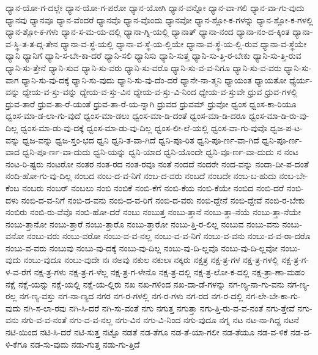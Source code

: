 {ಧ್ಯಾನ-ಯೋ-ಗ-ದಲ್ಲೇ
ಧ್ಯಾನ-ಯೋ-ಗ-ಪರೋ
ಧ್ಯಾನ-ಯೋಗಿ
ಧ್ಯಾನ-ವನ್ನೋ
ಧ್ಯಾನ-ವಾ-ಗಲಿ
ಧ್ಯಾನ-ವಾ-ಗು-ವುದು
ಧ್ಯಾನವು
ಧ್ಯಾನವೂ
ಧ್ಯಾನ-ವೆಂದರೆ
ಧ್ಯಾನವೊ
ಧ್ಯಾನ-ವೊಂದು
ಧ್ಯಾನವೋ
ಧ್ಯಾನ-ಶ್ಲೋ-ಕ-ಗಳನ್ನು
ಧ್ಯಾನ-ಶ್ಲೋ-ಕ-ಗಳಲ್ಲಿ
ಧ್ಯಾನ-ಶ್ಲೋ-ಕ-ಗಳು
ಧ್ಯಾನ-ಸ-ಮ-ಯ-ದಲ್ಲಿ
ಧ್ಯಾನಾ-ಗ್ನಿ-ಯಲ್ಲಿ
ಧ್ಯಾನಾತ್
ಧ್ಯಾನಾ-ನಂದ
ಧ್ಯಾನಾ-ನಂ-ದ-ಕ್ಕಿಂತ
ಧ್ಯಾನಾ-ವ-ಸ್ಥಿ-ತ-ತ-ದ್ಗ-ತೇನ
ಧ್ಯಾನಾ-ವ-ಸ್ಥೆ-ಯಲ್ಲಿ
ಧ್ಯಾನಾ-ವ-ಸ್ಥೆ-ಯ-ಲ್ಲಿಯೇ
ಧ್ಯಾನಾ-ವ-ಸ್ಥೆ-ಯ-ಲ್ಲಿ-ರುವ
ಧ್ಯಾನಾ-ವ-ಸ್ಥೆಯೇ
ಧ್ಯಾನಿ
ಧ್ಯಾನಿಗೆ
ಧ್ಯಾನಿ-ಸ-ಬೇ-ಕಾ-ದರೆ
ಧ್ಯಾನಿ-ಸಲಿ
ಧ್ಯಾನಿಸು
ಧ್ಯಾನಿ-ಸುತ್ತ
ಧ್ಯಾನಿ-ಸು-ತ್ತಿ-ರ-ಬೇಕು
ಧ್ಯಾನಿ-ಸು-ತ್ತಿ-ರುವ
ಧ್ಯಾನಿ-ಸು-ತ್ತೇನೆ
ಧ್ಯಾನಿ-ಸುವ
ಧ್ಯಾನಿ-ಸು-ವರು
ಧ್ಯಾನಿ-ಸು-ವರೊ
ಧ್ಯಾನಿ-ಸು-ವ-ವ-ನಿಗೂ
ಧ್ಯಾನಿ-ಸು-ವ-ವರು
ಧ್ಯಾನಿ-ಸು-ವಾಗ
ಧ್ಯಾನಿ-ಸು-ವು-ದಕ್ಕೆ
ಧ್ಯಾನಿ-ಸು-ವುದು
ಧ್ಯಾನಿ-ಸು-ವು-ದೆಂ-ದರೆ
ಧ್ಯಾನೇ-ನಾ-ತ್ಮನಿ
ಧ್ಯಾಯಂತ
ಧ್ಯಾಯತೋ
ಧ್ಯೆರ್ಯ-ವನ್ನು
ಧ್ಯೇಯ-ವ-ಸ್ತು-ವನ್ನು
ಧ್ಯೇಯ-ವ-ಸ್ತು-ವಿನ
ಧ್ಯೇಯ-ವ-ಸ್ತು-ವಿ-ನಿಂದ
ಧ್ಯೇಯ-ವ-ಸ್ತುವೇ
ಧ್ರುವ
ಧ್ರುವ-ಗಳಲ್ಲಿ
ಧ್ರುವ-ತಾರೆ
ಧ್ರುವ-ತಾ-ರೆ-ಯಂತೆ
ಧ್ರುವ-ತಾ-ರೆ-ಯ-ನ್ನಾಗಿ
ಧ್ರುವದ
ಧ್ರುವಮ್
ಧ್ರುವೋ
ಧ್ವಂಸ
ಧ್ವಂಸ-ಕಾ-ರಿಯೂ
ಧ್ವಂಸ-ಮಾ-ಡ-ಲಾ-ಗು-ವುದೆ
ಧ್ವಂಸ-ಮಾ-ಡಲು
ಧ್ವಂಸ-ಮಾ-ಡಿ-ದಂತೆ
ಧ್ವಂಸ-ಮಾ-ಡಿ-ದರೂ
ಧ್ವಂಸ-ಮಾ-ಡಿ-ರು-ವು-ದಿಲ್ಲ
ಧ್ವಂಸ-ಮಾ-ಡು-ವು-ದಕ್ಕೆ
ಧ್ವಂಸ-ಮಾ-ಡು-ವು-ದಿಲ್ಲ
ಧ್ವಂಸ-ಲೀ-ಲೆ-ಯಲ್ಲಿ
ಧ್ವಂಸ-ವಾ-ಗು-ವುವೊ
ಧ್ವಜ-ಪ-ಟ-ವನ್ನು
ಧ್ವಜ-ವನ್ನು
ಧ್ವಜ-ಸ್ತಂ-ಭದ
ಧ್ವನಿ
ಧ್ವನಿ-ತ-ವಾ-ಗಿದೆ
ಧ್ವನಿ-ಪೂ-ರಿತ
ಧ್ವನಿ-ಪೂ-ರ್ಣ-ವಾ-ಗಿದೆ
ಧ್ವನಿ-ಪೂ-ರ್ಣ-ವಾದ
ಧ್ವನಿ-ಪೂ-ರ್ಣ-ವಾ-ದುದು
ಧ್ವನಿ-ಯನ್ನು
ಧ್ವನಿ-ಯಾದ
ಧ್ವನಿ-ಯೊಂದೇ
ಧ್ವನಿ-ವೂ-ರ್ಣ-ವಾ-ದುದು
ನ
ನಂಟ
ನಂಟ-ರಿ-ಷ್ಟರು
ನಂಟರೋ
ನಂತರ
ನಂತ-ರದ
ನಂತ-ರವೂ
ನಂತೆ
ನಂದದೆ
ನಂದರೇ
ನಂದ-ವನ್ನು
ನಂದಾ-ದೀ-ಪ-ದಂತೆ
ನಂದಿ-ಹೋ-ಗು-ವು-ದಿಲ್ಲ
ನಂಬದ
ನಂಬ-ದ-ವ-ನಿಗೆ
ನಂಬ-ದ-ವರು
ನಂಬದೆ
ನಂಬದೇ
ನಂಬ-ಬ-ಹುದು
ನಂಬ-ಬೇ-ಕೆಂಬ
ನಂಬರು
ನಂಬರ್
ನಂಬಲು
ನಂಬಿ
ನಂಬಿಕೆ
ನಂಬಿ-ಕೆಗೆ
ನಂಬಿ-ಕೆಯ
ನಂಬಿ-ಕೆಯೇ
ನಂಬಿದ
ನಂಬಿ-ದರೆ
ನಂಬಿ-ದಳು
ನಂಬಿ-ದ-ವ-ನಿಗೆ
ನಂಬಿ-ದ-ವನು
ನಂಬಿ-ದ-ವ-ರಿಗೆ
ನಂಬಿ-ದ-ವರು
ನಂಬಿ-ದ್ದೇನೆ
ನಂಬಿ-ದ್ದೇವೆ
ನಂಬಿ-ರ-ಬೇಕು
ನಂಬಿರು
ನಂಬಿ-ರು-ವೆವೊ
ನಂಬಿ-ಹೋ-ದರೆ
ನಂಬು
ನಂಬುತ್ತ
ನಂಬು-ತ್ತಾನೆ
ನಂಬು-ತ್ತಾ-ನೆಯೆ
ನಂಬು-ತ್ತಾ-ನೆಯೇ
ನಂಬು-ತ್ತಾನೋ
ನಂಬು-ತ್ತಾರೆ
ನಂಬು-ತ್ತಾರೊ
ನಂಬು-ತ್ತಾರೋ
ನಂಬು-ತ್ತಿ-ರ-ಲಿಲ್ಲ
ನಂಬುವ
ನಂಬು-ವನು
ನಂಬು-ವನೋ
ನಂಬು-ವರು
ನಂಬು-ವರೋ
ನಂಬು-ವ-ವ-ನಲ್ಲ
ನಂಬು-ವ-ವ-ನಿಗೆ
ನಂಬು-ವ-ವನು
ನಂಬು-ವ-ವ-ರಾ-ದರೊ
ನಂಬು-ವ-ವರು
ನಂಬುವು
ನಂಬು-ವು-ದಕ್ಕೆ
ನಂಬು-ವು-ದಿಲ್ಲ
ನಂಬು-ವು-ದಿ-ಲ್ಲವೊ
ನಂಬು-ವು-ದಿ-ಲ್ಲವೋ
ನಂಬು-ವುದು
ನಂಬು-ವುದೂ
ನಂಬು-ವುದೇ
ನಃ
ನಅವು
ನಕುಲ
ನಕುಲಃ
ನಕ್ಕರು
ನಕ್ಷತ್ರ
ನಕ್ಷ-ತ್ರ-ಗಳ
ನಕ್ಷ-ತ್ರ-ಗಳಲ್ಲಿ
ನಕ್ಷ-ತ್ರ-ಗ-ಳ-ವ-ರೆಗೆ
ನಕ್ಷ-ತ್ರ-ಗಳು
ನಕ್ಷ-ತ್ರ-ಗ-ಳೆಲ್ಲ
ನಕ್ಷ-ತ್ರ-ಗ-ಳೇನೊ
ನಕ್ಷ-ತ್ರ-ದಲ್ಲಿ
ನಕ್ಷ-ತ್ರ-ಲೋ-ಕ-ದಲ್ಲಿ
ನಕ್ಷ-ತ್ರಾ-ಣಾ-ಮಹಂ
ನಕ್ಷೆ
ನಕ್ಷೆ-ಯನ್ನು
ನಕ್ಷೆ-ಯಲ್ಲಿ
ನಕ್ಷೆ-ಯ-ಲ್ಲಿರು
ನಖ
ನಖ-ಗಳಿಂದ
ನಖ-ದಾ-ಡೆ-ಗಳನ್ನು
ನಗ-ಣ್ಯ-ನಾ-ಗು-ವನು
ನಗ-ಣ್ಯ-ರಲ್ಲ
ನಗ-ಣ್ಯ-ವಸ್ತು
ನಗ-ನಾ-ಣ್ಯದ
ನಗರ
ನಗ-ರ-ಗಳಲ್ಲಿ
ನಗ-ರ-ಗಳು
ನಗ-ರದ
ನಗ-ರ-ದಲ್ಲಿ
ನಗ-ಲೇ-ಬೇ-ಕಾ-ಗು-ವುದು
ನಗಿ-ಸ-ಲಾ-ರವು
ನಗಿ-ಸಿ-ದರೆ
ನಗಿ-ಸು-ವಂತೆ
ನಗು
ನಗುತ್ತ
ನಗುತ್ತಾ
ನಗು-ತ್ತಿ-ರು-ವ-ವ-ನಂತೆ
ನಗು-ತ್ತೇವೆ
ನಗು-ವನು
ನಗು-ವ-ವ-ನಂತೆ
ನಗು-ವ-ವ-ನಲ್ಲ
ನಗು-ವಿನ
ನಗು-ವಿ-ನಿಂದ
ನಗು-ವುದೂ
ನಗ್ನ
ನಟ
ನಟ-ನಾ-ಗಿದ್ದ
ನಟನೆ
ನಟಿ-ಯಿಂದ
ನಟಿ-ಸಿ-ದರೆ
ನಟಿ-ಸುತ್ತ
ನಟ್ಟೊ
ನಡತೆ
ನಡ-ತೆಗೂ
ನಡ-ತೆ-ಯಾ-ಗಲೀ
ನಡ-ತೆಯೂ
ನಡ-ವ-ಳಿಕೆ
ನಡ-ವ-ಳಿ-ಕೆಗೂ
ನಡ-ಸು-ವುದು
ನಡು-ಗುತ್ತ
ನಡು-ಗು-ತ್ತಿದೆ
}
